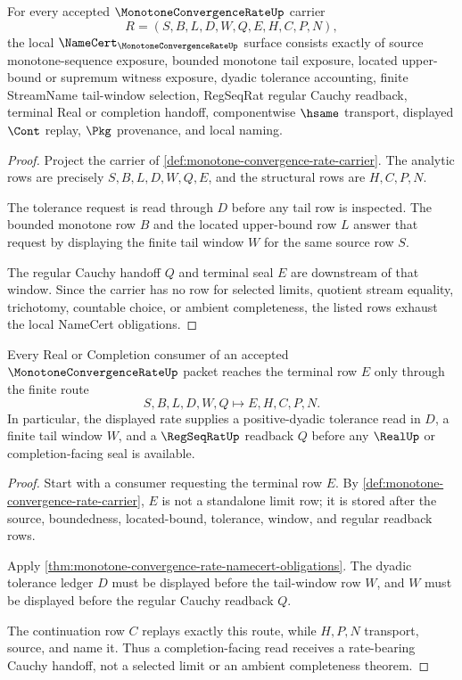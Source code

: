 \begin{theorem}
\label{thm:monotone-convergence-rate-namecert-obligations}
For every accepted $\MonotoneConvergenceRateUp$ carrier
$$
R=(S,B,L,D,W,Q,E,H,C,P,N),
$$
the local $\NameCert_{\MonotoneConvergenceRateUp}$ surface consists exactly of source monotone-sequence exposure, bounded monotone tail exposure, located upper-bound or supremum witness exposure, dyadic tolerance accounting, finite StreamName tail-window selection, RegSeqRat regular Cauchy readback, terminal Real or completion handoff, componentwise $\hsame$ transport, displayed $\Cont$ replay, $\Pkg$ provenance, and local naming.
\end{theorem}
\begin{proof}
Project the carrier of \autoref{def:monotone-convergence-rate-carrier}. The analytic rows are precisely $S,B,L,D,W,Q,E$, and the structural rows are $H,C,P,N$.

The tolerance request is read through $D$ before any tail row is inspected. The bounded monotone row $B$ and the located upper-bound row $L$ answer that request by displaying the finite tail window $W$ for the same source row $S$.

The regular Cauchy handoff $Q$ and terminal seal $E$ are downstream of that window. Since the carrier has no row for selected limits, quotient stream equality, trichotomy, countable choice, or ambient completeness, the listed rows exhaust the local NameCert obligations.
\end{proof}

\begin{theorem}
\label{thm:monotone-convergence-rate-regular-cauchy-handoff}
Every Real or Completion consumer of an accepted $\MonotoneConvergenceRateUp$ packet reaches the terminal row $E$ only through the finite route
$$
S,B,L,D,W,Q \longmapsto E,H,C,P,N .
$$
In particular, the displayed rate supplies a positive-dyadic tolerance read in $D$, a finite tail window $W$, and a $\RegSeqRatUp$ readback $Q$ before any $\RealUp$ or completion-facing seal is available.
\end{theorem}
\begin{proof}
Start with a consumer requesting the terminal row $E$. By \autoref{def:monotone-convergence-rate-carrier}, $E$ is not a standalone limit row; it is stored after the source, boundedness, located-bound, tolerance, window, and regular readback rows.

Apply \autoref{thm:monotone-convergence-rate-namecert-obligations}. The dyadic tolerance ledger $D$ must be displayed before the tail-window row $W$, and $W$ must be displayed before the regular Cauchy readback $Q$.

The continuation row $C$ replays exactly this route, while $H,P,N$ transport, source, and name it. Thus a completion-facing read receives a rate-bearing Cauchy handoff, not a selected limit or an ambient completeness theorem.
\end{proof}

